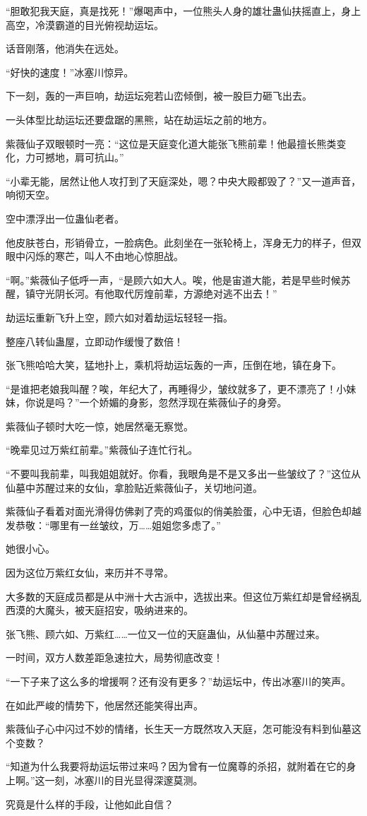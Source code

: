 \begin{this_body}
“胆敢犯我天庭，真是找死！”爆喝声中，一位熊头人身的雄壮蛊仙扶摇直上，身上高空，冷漠霸道的目光俯视劫运坛。

话音刚落，他消失在远处。

“好快的速度！”冰塞川惊异。

下一刻，轰的一声巨响，劫运坛宛若山峦倾倒，被一股巨力砸飞出去。

一头体型比劫运坛还要盘踞的黑熊，站在劫运坛之前的地方。

紫薇仙子双眼顿时一亮：“这位是天庭变化道大能张飞熊前辈！他最擅长熊类变化，力可撼地，肩可抗山。”

“小辈无能，居然让他人攻打到了天庭深处，嗯？中央大殿都毁了？”又一道声音，响彻天空。

空中漂浮出一位蛊仙老者。

他皮肤苍白，形销骨立，一脸病色。此刻坐在一张轮椅上，浑身无力的样子，但双眼中闪烁的寒芒，叫人不由地心惊胆战。

“啊。”紫薇仙子低呼一声，“是顾六如大人。唉，他是宙道大能，若是早些时候苏醒，镇守光阴长河。有他取代厉煌前辈，方源绝对逃不出去！”

劫运坛重新飞升上空，顾六如对着劫运坛轻轻一指。

整座八转仙蛊屋，立即动作缓慢了数倍！

张飞熊哈哈大笑，猛地扑上，乘机将劫运坛轰的一声，压倒在地，镇在身下。

“是谁把老娘我叫醒？唉，年纪大了，再睡得少，皱纹就多了，更不漂亮了！小妹妹，你说是吗？”一个娇媚的身影，忽然浮现在紫薇仙子的身旁。

紫薇仙子顿时大吃一惊，她居然毫无察觉。

“晚辈见过万紫红前辈。”紫薇仙子连忙行礼。

“不要叫我前辈，叫我姐姐就好。你看，我眼角是不是又多出一些皱纹了？”这位从仙墓中苏醒过来的女仙，拿脸贴近紫薇仙子，关切地问道。

紫薇仙子看着对面光滑得仿佛剥了壳的鸡蛋似的俏美脸蛋，心中无语，但脸色却越发恭敬：“哪里有一丝皱纹，万……姐姐您多虑了。”

她很小心。

因为这位万紫红女仙，来历并不寻常。

大多数的天庭成员都是从中洲十大古派中，选拔出来。但这位万紫红却是曾经祸乱西漠的大魔头，被天庭招安，吸纳进来的。

张飞熊、顾六如、万紫红……一位又一位的天庭蛊仙，从仙墓中苏醒过来。

一时间，双方人数差距急速拉大，局势彻底改变！

“一下子来了这么多的增援啊？还有没有更多？”劫运坛中，传出冰塞川的笑声。

在如此严峻的情势下，他居然还能笑得出声。

紫薇仙子心中闪过不妙的情绪，长生天一方既然攻入天庭，怎可能没有料到仙墓这个变数？

“知道为什么我要将劫运坛带过来吗？因为曾有一位魔尊的杀招，就附着在它的身上啊。”这一刻，冰塞川的目光显得深邃莫测。

究竟是什么样的手段，让他如此自信？

\end{this_body}

